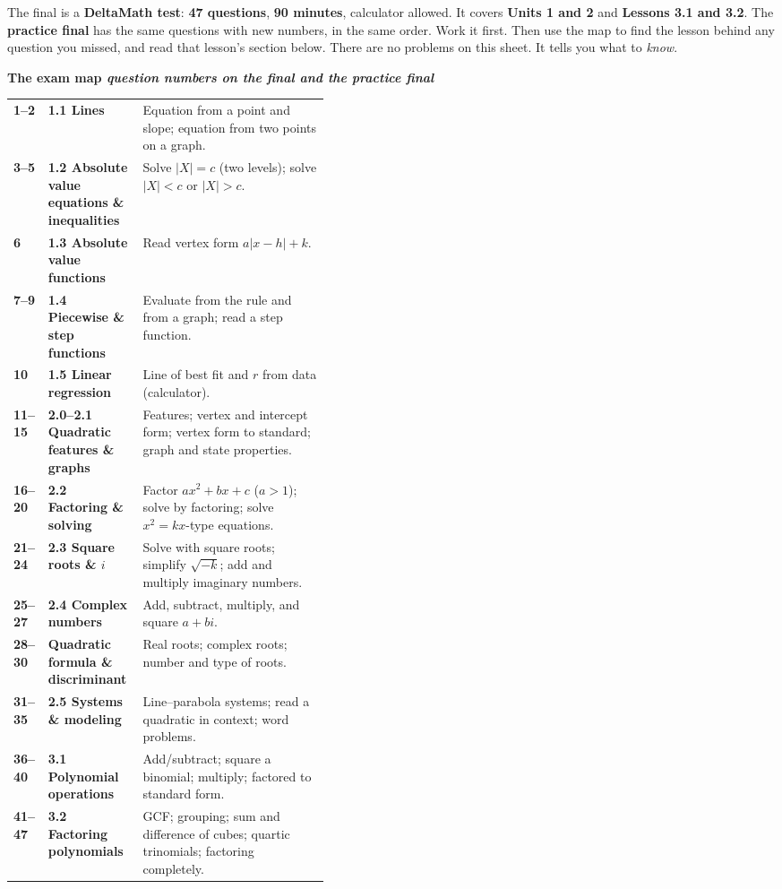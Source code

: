 \documentclass[10pt]{article}
\newcommand{\sghead}[2]{%
  \boxguard[10]%
  \vspace{4pt}\par\noindent
  \colorbox{forest}{\parbox{\dimexpr\linewidth-2\fboxsep}{%
    \small\color{white}\bfseries #1 \hfill \textmd{\itshape\scriptsize\color{forestmid} #2}}}%
  \vspace{2pt}\par}
\newcommand{\sgtabsetup}{\renewcommand{\arraystretch}{1.06}\footnotesize}
\begin{document}

\vspace{-0.30in}
\noindent\footnotesize The final is a \textbf{DeltaMath test}: \textbf{47 questions},
\textbf{90 minutes}, calculator allowed. It covers \textbf{Units 1 and 2} and \textbf{Lessons 3.1
and 3.2}. The \textbf{practice final} has the same questions with new numbers, in the same order.
Work it first. Then use the map to find the lesson behind any question you missed, and read that
lesson's section below. There are no problems on this sheet. It tells you what to \emph{know}.
\par\normalsize

\sghead{The exam map}{question numbers on the final and the practice final}
{\sgtabsetup
\begin{tabularx}{\linewidth}{@{} >{\bfseries\leavevmode\color{forest}}p{0.11\linewidth} >{\bfseries}p{0.30\linewidth} X @{}}
1--2   & 1.1 Lines & Equation from a point and slope; equation from two points on a graph. \\
3--5   & 1.2 Absolute value equations \& inequalities & Solve $|X|=c$ (two levels); solve $|X|<c$ or $|X|>c$. \\
6      & 1.3 Absolute value functions & Read vertex form $a|x-h|+k$. \\
7--9   & 1.4 Piecewise \& step functions & Evaluate from the rule and from a graph; read a step function. \\
10     & 1.5 Linear regression & Line of best fit and $r$ from data (calculator). \\
11--15 & 2.0--2.1 Quadratic features \& graphs & Features; vertex and intercept form; vertex form to standard; graph and state properties. \\
16--20 & 2.2 Factoring \& solving & Factor $ax^2+bx+c$ ($a>1$); solve by factoring; solve $x^2=kx$-type equations. \\
21--24 & 2.3 Square roots \& $i$ & Solve with square roots; simplify $\sqrt{-k}$; add and multiply imaginary numbers. \\
25--27 & 2.4 Complex numbers & Add, subtract, multiply, and square $a+bi$. \\
28--30 & Quadratic formula \& discriminant & Real roots; complex roots; number and type of roots. \\
31--35 & 2.5 Systems \& modeling & Line--parabola systems; read a quadratic in context; word problems. \\
36--40 & 3.1 Polynomial operations & Add/subtract; square a binomial; multiply; factored to standard form. \\
41--47 & 3.2 Factoring polynomials & GCF; grouping; sum and difference of cubes; quartic trinomials; factoring completely. \\
\end{tabularx}}
\end{document}
